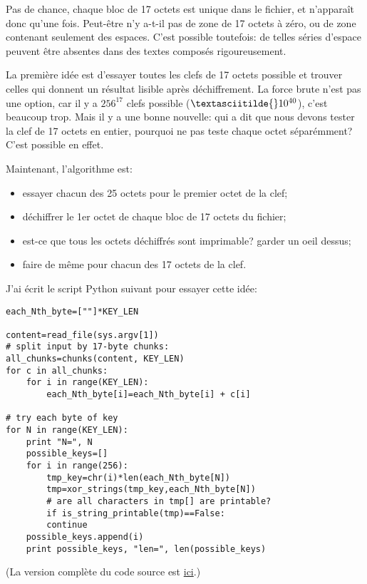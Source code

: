 Pas de chance, chaque bloc de 17 octets est unique dans le fichier, et n'apparaît
donc qu'une fois.
Peut-être n'y a-t-il pas de zone de 17 octets à zéro, ou de zone contenant seulement
des espaces.
C'est possible toutefois: de telles séries d'espace peuvent être absentes dans des
textes composés rigoureusement.

La première idée est d'essayer toutes les clefs de 17 octets possible et trouver
celles qui donnent un résultat lisible après déchiffrement.
La force brute n'est pas une option, car il y a $256^{17}$ clefs possible ($\textasciitilde{}10^{40}$),
c'est beaucoup trop.
Mais il y a une bonne nouvelle: qui a dit que nous devons tester la clef de 17 octets
en entier, pourquoi ne pas teste chaque octet séparémment?
C'est possible en effet.

Maintenant, l'algorithme est:

\begin{itemize}
\item essayer chacun des 25 octets pour le premier octet de la clef;
\item déchiffrer le 1er octet de chaque bloc de 17 octets du fichier;
\item est-ce que tous les octets déchiffrés sont imprimable? garder un oeil dessus;
\item faire de même pour chacun des 17 octets de la clef.
\end{itemize}

J'ai écrit le script Python suivant pour essayer cette idée:

\begin{lstlisting}[caption=Python script,style=custompy]
each_Nth_byte=[""]*KEY_LEN

content=read_file(sys.argv[1])
# split input by 17-byte chunks:
all_chunks=chunks(content, KEY_LEN)
for c in all_chunks:
    for i in range(KEY_LEN):
        each_Nth_byte[i]=each_Nth_byte[i] + c[i]

# try each byte of key
for N in range(KEY_LEN):
    print "N=", N
    possible_keys=[]
    for i in range(256):
        tmp_key=chr(i)*len(each_Nth_byte[N])
        tmp=xor_strings(tmp_key,each_Nth_byte[N])
        # are all characters in tmp[] are printable?
        if is_string_printable(tmp)==False:
	    continue
	possible_keys.append(i)
    print possible_keys, "len=", len(possible_keys)
\end{lstlisting}

(La version complète du code source est
 \href{\GitHubBlobMasterURL/ff/XOR/mask_2/files/decrypt2.py}{ici}.)

